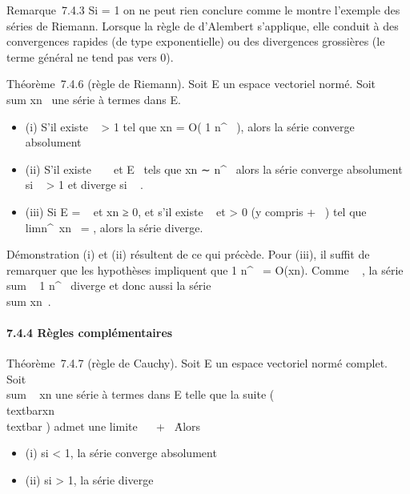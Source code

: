 Remarque~7.4.3 Si \ell = 1 on ne peut rien conclure comme le montre
l'exemple des séries de Riemann. Lorsque la règle de d'Alembert
s'applique, elle conduit à des convergences rapides (de type
exponentielle) ou des divergences grossières (le terme général ne tend
pas vers 0).

Théorème~7.4.6 (règle de Riemann). Soit E un espace vectoriel normé.
Soit \\sum  xn~
une série à termes dans E.

\begin{itemize}
\itemsep1pt\parskip0pt
\item
  (i) S'il existe \alpha~ \textgreater{} 1 tel que xn = O( 1
  \over n^\alpha~ ), alors la série converge
  absolument
\item
  (ii) S'il existe \alpha~ \in {}~ et \ell \in E \diagdown\0\
  tels que xn ∼ \ell \over n^\alpha~
  alors la série converge absolument si \alpha~ \textgreater{} 1 et diverge si
  \alpha~ \leq 1.
\item
  (iii) Si E = ~ et xn ≥ 0, et s'il existe \alpha~  et \ell
  \textgreater{} 0 (y compris + \infty~) tel que
  limn^\alpha~xn~ = \ell, alors la
  série diverge.
\end{itemize}

Démonstration (i) et (ii) résultent de ce qui précède. Pour (iii), il
suffit de remarquer que les hypothèses impliquent que  1
\over n^\alpha~ = O(xn). Comme \alpha~ , la
série \\sum ~  1
\over n^\alpha~ diverge et donc aussi la série
\\sum  xn~.

\paragraph{7.4.4 Règles complémentaires}

Théorème~7.4.7 (règle de Cauchy). Soit E un espace vectoriel normé
complet. Soit \\sum ~
xn une série à termes dans E telle que la suite
\left
(\rootn\of\\textbar{}xn\\textbar{}\right
) admet une limite \ell \in {}~ \cup\ + \infty~\.
Alors

\begin{itemize}
\itemsep1pt\parskip0pt
\item
  (i) si \ell \textless{} 1, la série converge absolument
\item
  (ii) si \ell \textgreater{} 1, la série diverge
\end{itemize}


